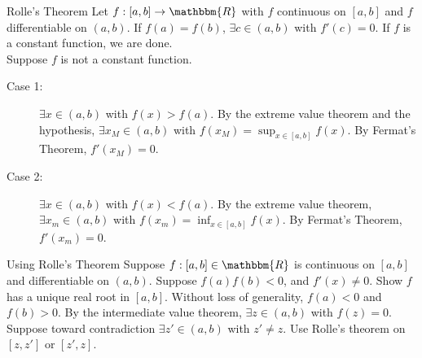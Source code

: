 \documentclass[10pt]{extarticle}
\newcommand{\R}{\mathbbm{R}}
\begin{document}
  \begin{problem}{Rolle's Theorem}
    Let $f: [a,b]\rightarrow \R$ with $f$ continuous on $[a,b]$ and $f$ differentiable on $(a,b)$. If $f(a) = f(b)$, $\exists c\in (a,b)$ with $f'(c) = 0$.
    \tcblower
    If $f$ is a constant function, we are done.\\

    Suppose $f$ is not a constant function.
    \begin{description}
      \item[Case 1:] $\exists x\in (a,b)$ with $f(x) > f(a)$. By the extreme value theorem and the hypothesis, $\exists x_M\in (a,b)$ with $f(x_M) = \sup_{x\in [a,b]} f(x)$. By Fermat's Theorem, $f'(x_M) = 0$.
      \item[Case 2:] $\exists x\in (a,b)$ with $f(x) < f(a)$. By the extreme value theorem, $\exists x_m\in (a,b)$ with $f(x_m) = \inf_{x\in [a,b]}f(x)$. By Fermat's Theorem, $f'(x_m) = 0$.
    \end{description}
  \end{problem}
  \begin{problem}{Using Rolle's Theorem}
    Suppose $f: [a,b]\in\R$ is continuous on $[a,b]$ and differentiable on $(a,b)$. Suppose $f(a)f(b) < 0$, and $f'(x) \neq 0$. Show $f$ has a unique real root in $[a,b]$.
    \tcblower
    Without loss of generality, $f(a) < 0$ and $f(b) > 0$. By the intermediate value theorem, $\exists z\in (a,b)$ with $f(z) = 0$. \\

    Suppose toward contradiction $\exists z'\in (a,b)$ with $z'\neq z$. Use Rolle's theorem on $[z,z']$ or $[z',z]$.
  \end{problem}
\end{document}

